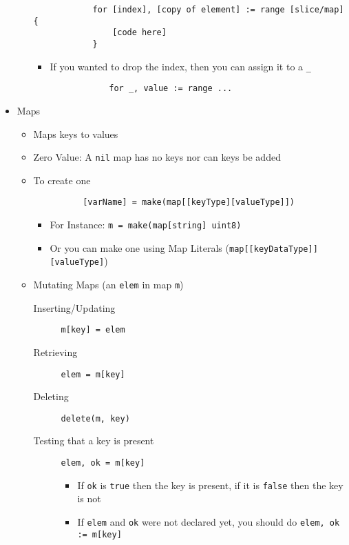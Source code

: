 \documentclass[11pt, oneside]{article}   	%
\begin{document}
\begin{itemize}
\begin{itemize}
          \begin{verbatim}
            for [index], [copy of element] := range [slice/map] {
                [code here]
            }
          \end{verbatim}
          \begin{itemize}
            \item If you wanted to drop the index, then you can assign it to a \texttt{\_}
            \begin{verbatim}
            for _, value := range ...
            \end{verbatim}
          \end{itemize}
      \end{itemize}
    \item Maps \label{Maps}
      \begin{itemize}
        \item Maps keys to values
        \item Zero Value: A \texttt{nil} map has no keys nor can keys be added
        \item To create one
        \begin{verbatim}
          [varName] = make(map[[keyType][valueType]])
        \end{verbatim}
        \begin{itemize}
          \item For Instance: \texttt{m = make(map[string] uint8)}
          \item Or you can make one using Map Literals (\texttt{map[[keyDataType]] [valueType]})
        \end{itemize}
        \item Mutating Maps (an \texttt{elem} in map \texttt{m})
          \begin{description}
            \item[Inserting/Updating] \texttt{m[key] = elem}
            \item[Retrieving] \texttt{elem = m[key]}
            \item[Deleting] \texttt{delete(m, key)}
            \item[Testing that a key is present] \texttt{elem, ok = m[key]}
              \begin{itemize}
                 \item If \texttt{ok} is \texttt{true} then the key is present, if it is \texttt{false} then the key is not
                 \item If \texttt{elem} and \texttt{ok} were not declared yet, you should do \texttt{elem, ok := m[key]}
               \end{itemize}
          \end{description}
      \end{itemize}
  \end{itemize}
\end{document}
